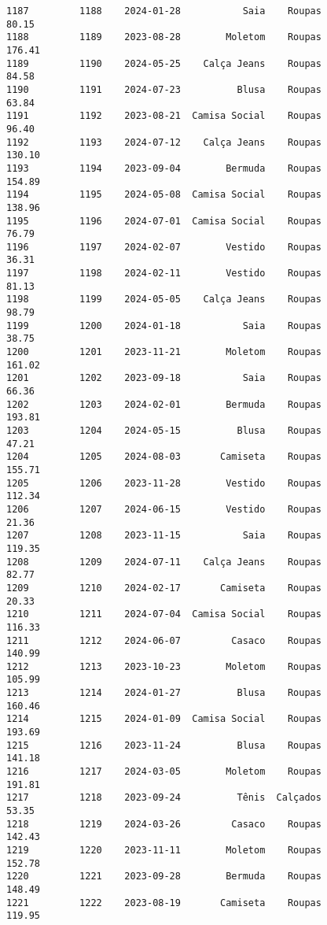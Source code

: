 \documentclass[11pt]{article}
\begin{document}
\begin{Verbatim}[commandchars=\\\{\}]
1187         1188    2024-01-28           Saia    Roupas           80.15   
1188         1189    2023-08-28        Moletom    Roupas          176.41   
1189         1190    2024-05-25    Calça Jeans    Roupas           84.58   
1190         1191    2024-07-23          Blusa    Roupas           63.84   
1191         1192    2023-08-21  Camisa Social    Roupas           96.40   
1192         1193    2024-07-12    Calça Jeans    Roupas          130.10   
1193         1194    2023-09-04        Bermuda    Roupas          154.89   
1194         1195    2024-05-08  Camisa Social    Roupas          138.96   
1195         1196    2024-07-01  Camisa Social    Roupas           76.79   
1196         1197    2024-02-07        Vestido    Roupas           36.31   
1197         1198    2024-02-11        Vestido    Roupas           81.13   
1198         1199    2024-05-05    Calça Jeans    Roupas           98.79   
1199         1200    2024-01-18           Saia    Roupas           38.75   
1200         1201    2023-11-21        Moletom    Roupas          161.02   
1201         1202    2023-09-18           Saia    Roupas           66.36   
1202         1203    2024-02-01        Bermuda    Roupas          193.81   
1203         1204    2024-05-15          Blusa    Roupas           47.21   
1204         1205    2024-08-03       Camiseta    Roupas          155.71   
1205         1206    2023-11-28        Vestido    Roupas          112.34   
1206         1207    2024-06-15        Vestido    Roupas           21.36   
1207         1208    2023-11-15           Saia    Roupas          119.35   
1208         1209    2024-07-11    Calça Jeans    Roupas           82.77   
1209         1210    2024-02-17       Camiseta    Roupas           20.33   
1210         1211    2024-07-04  Camisa Social    Roupas          116.33   
1211         1212    2024-06-07         Casaco    Roupas          140.99   
1212         1213    2023-10-23        Moletom    Roupas          105.99   
1213         1214    2024-01-27          Blusa    Roupas          160.46   
1214         1215    2024-01-09  Camisa Social    Roupas          193.69   
1215         1216    2023-11-24          Blusa    Roupas          141.18   
1216         1217    2024-03-05        Moletom    Roupas          191.81   
1217         1218    2023-09-24          Tênis  Calçados           53.35   
1218         1219    2024-03-26         Casaco    Roupas          142.43   
1219         1220    2023-11-11        Moletom    Roupas          152.78   
1220         1221    2023-09-28        Bermuda    Roupas          148.49   
1221         1222    2023-08-19       Camiseta    Roupas          119.95   

\end{Verbatim}
\end{document}
